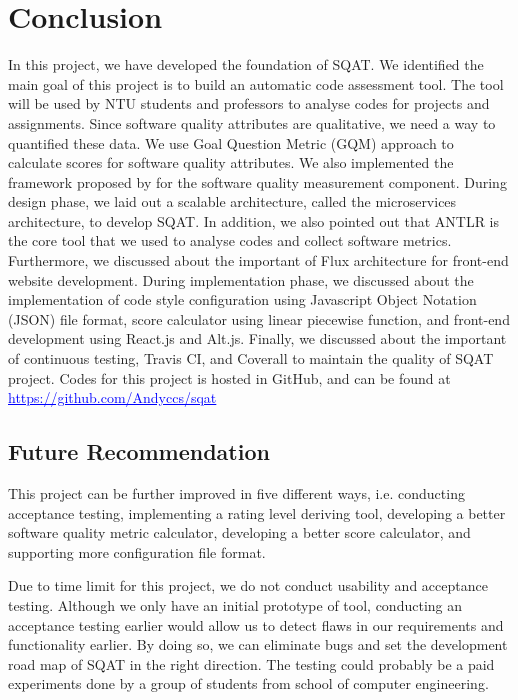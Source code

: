\chapter{Conclusion}

In this project, we have developed the foundation of SQAT. We identified the main goal of this project is to build an automatic code assessment tool. The tool will be used by NTU students and professors to analyse codes for projects and assignments. Since software quality attributes are qualitative, we need a way to quantified these data. We use Goal Question Metric (GQM) approach to calculate scores for software quality attributes. We also implemented the framework proposed by \cite{washizaki2007framework} for the software quality measurement component. During design phase, we laid out a scalable architecture, called the microservices architecture, to develop SQAT. In addition, we also pointed out that ANTLR is the core tool that we used to analyse codes and collect software metrics. Furthermore, we discussed about the important of Flux architecture for front-end website development. During implementation phase, we discussed about the implementation of code style configuration using Javascript Object Notation (JSON) file format, score calculator using linear piecewise function, and front-end development using React.js and Alt.js. Finally, we discussed about the important of continuous testing, Travis CI, and Coverall to maintain the quality of SQAT project. Codes for this project is hosted in GitHub, and can be found at \textcolor{blue}{\underline{https://github.com/Andyccs/sqat}}

\section{Future Recommendation} \label{section:future_recommendation}

This project can be further improved in five different ways, i.e. conducting acceptance testing, implementing a rating level deriving tool, developing a better software quality metric calculator, developing a better score calculator, and supporting more configuration file format. 

Due to time limit for this project, we do not conduct usability and acceptance testing. Although we only have an initial prototype of tool, conducting an acceptance testing earlier would allow us to detect flaws in our requirements and functionality earlier. By doing so, we can eliminate bugs and set the development road map of SQAT in the right direction. The testing could probably be a paid experiments done by a group of students from school of computer engineering. 

